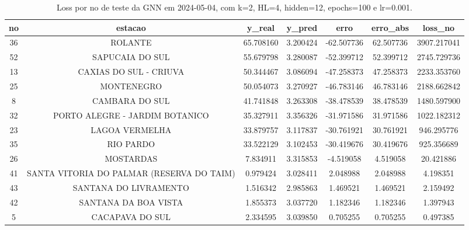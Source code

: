 \begin{table}[h]
\centering
\caption{Loss por no de teste da GNN em 2024-05-04, com k=2, HL=4, hidden=12, epochs=100 e lr=0.001.}
\label{tab:gnn_loss_k2_hl4_h12_e100_d20240504}
\begin{tabular}{ccccccc}
\toprule
no & estacao & y\_real & y\_pred & erro & erro\_abs & loss\_no \\
\midrule
36 & ROLANTE & 65.708160 & 3.200424 & -62.507736 & 62.507736 & 3907.217041 \\
52 & SAPUCAIA DO SUL & 55.679798 & 3.280087 & -52.399712 & 52.399712 & 2745.729736 \\
13 & CAXIAS DO SUL - CRIUVA & 50.344467 & 3.086094 & -47.258373 & 47.258373 & 2233.353760 \\
25 & MONTENEGRO & 50.054073 & 3.270927 & -46.783146 & 46.783146 & 2188.662842 \\
8 & CAMBARA DO SUL & 41.741848 & 3.263308 & -38.478539 & 38.478539 & 1480.597900 \\
32 & PORTO ALEGRE - JARDIM BOTANICO & 35.327911 & 3.356326 & -31.971586 & 31.971586 & 1022.182312 \\
23 & LAGOA VERMELHA & 33.879757 & 3.117837 & -30.761921 & 30.761921 & 946.295776 \\
35 & RIO PARDO & 33.522129 & 3.102453 & -30.419676 & 30.419676 & 925.356689 \\
26 & MOSTARDAS & 7.834911 & 3.315853 & -4.519058 & 4.519058 & 20.421886 \\
41 & SANTA VITORIA DO PALMAR (RESERVA DO TAIM) & 0.979424 & 3.028411 & 2.048988 & 2.048988 & 4.198351 \\
43 & SANTANA DO LIVRAMENTO & 1.516342 & 2.985863 & 1.469521 & 1.469521 & 2.159492 \\
42 & SANTANA DA BOA VISTA & 1.855373 & 3.037720 & 1.182346 & 1.182346 & 1.397943 \\
5 & CACAPAVA DO SUL & 2.334595 & 3.039850 & 0.705255 & 0.705255 & 0.497385 \\
\bottomrule
\end{tabular}
\end{table}
